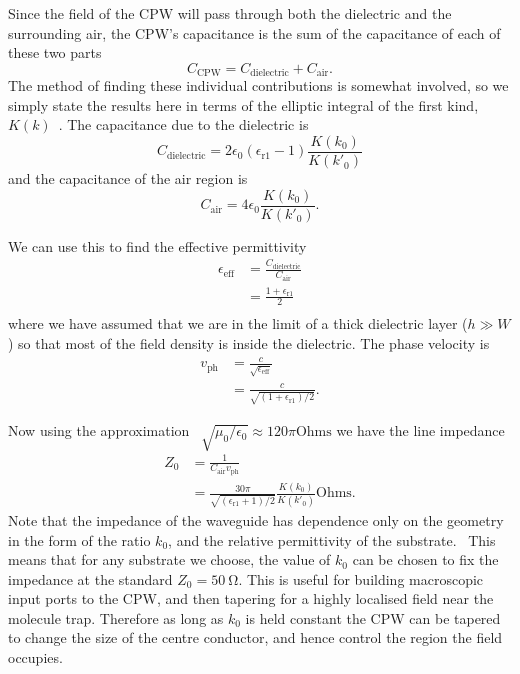 Since the field of the CPW will pass through both the dielectric and the
surrounding air, the CPW's capacitance is the sum of the capacitance of each of
these two parts
%
\begin{equation}
  C_\text{CPW} = C_\text{dielectric} + C_\text{air}.
\end{equation}
%
The method of finding these individual contributions is somewhat involved, so
we simply state the results here in terms of the elliptic integral of the
first kind, $K(k)$~\cite{Simons2004}. The capacitance due to the dielectric is
%
%
\begin{equation}
  C_\text{dielectric} = 2\epsilon_0(\epsilon_\text{r1}-1)\frac{K(k_0)}{K(k'_0)}
\end{equation}
%
and the capacitance of the air region is
%
\begin{equation}
  C_\text{air} = 4\epsilon_0 \frac{K(k_0)}{K(k'_0)}.
\end{equation}

We can use this to find the effective permittivity~\cite{Simons2004}
%
\begin{align}
  \epsilon_\text{eff} &= \frac{C_\text{dielectric}}{C_\text{air}} \\
    &= \frac{1+ \epsilon_\text{r1}}{2} \\
\end{align}
%
where we have assumed that we are in the limit of a thick dielectric layer ($h
\gg W$) so that most of the field density is inside the dielectric.
%
The phase velocity  is~\cite{Simons2004}
%
\begin{align}
  v_\text{ph} &= \frac{c}{\sqrt{\epsilon_\text{eff}}} \\
    &= \frac{c}{\sqrt{(1 + \epsilon_\text{r1})/2}}.
\end{align}

Now using the approximation~\cite{Collin2007}
$\sqrt{\mu_0/\epsilon_0}\approx120\pi\text{Ohms}$ we have the line
impedance~\cite{Simons2004}
\begin{align}
  Z_0 &= \frac{1}{C_\text{air} v_\text{ph}} \\
    &= \frac{30 \pi}{\sqrt{(\epsilon_\text{r1}+1)/2}} \frac{K(k_0)}{K(k'_0)}
    \text{Ohms}.
    \label{mws:eqn:Z0}
\end{align}
Note that the impedance of the waveguide has dependence only on the geometry in
the form of the ratio $k_0$, and the relative permittivity of the
substrate.~\cite{Simons2004} This means that for any substrate we choose, the
value of $k_0$ can be chosen to fix the impedance at the standard $Z_0 =
\SI{50}{\ohm}$. This is useful for building macroscopic input ports to the CPW,
and then tapering for a highly localised field near the molecule trap.
%
Therefore as long as $k_0$ is held constant the CPW can be tapered to change the
size of the centre conductor, and hence control the region the field occupies.

